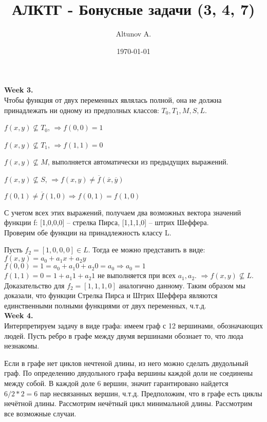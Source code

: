 \documentclass[a4paper,12pt]{article}
\author{Altunov A.}
\title{АЛКТГ - Бонусные задачи (3, 4, 7)}
\date{\today}
\begin{document}
\maketitle
\newpage
\textbf{Week 3.}
\\

Чтобы функция от двух переменных являлась полной, она не должна принадлежать ни одному из предполных классов: $ T_0, T_1, M, S, L $.

$ f(x,y) \nsubseteq T_0$, $ \Rightarrow f(0,0) = 1$

$ f(x,y) \nsubseteq T_1$, $ \Rightarrow f(1,1) = 0$

$ f(x,y) \nsubseteq M $, выполняется автоматически из предыдущих выражений.

$ f(x,y) \nsubseteq S $, $ \Rightarrow f(x,y) \neq \overline{f}(\overline{x},\overline{y}) $

$ f(0,1) \neq \overline{f}(1,0) \Rightarrow  f(0,1) = f(1,0) $

С учетом всех этих выражений, получаем два возможных вектора значений функции f: [1,0,0,0] -- стрелка Пирса, [1,1,1,0] -- штрих Шеффера.
\\
Проверим обе функции на принадлежность классу L.

Пусть $f_2 = [1,0,0,0] \in L$. Тогда ее можно представить в виде: $ f(x,y) = a_0 + a_1 x + a_2 y $
\\
$f(0,0) = 1 = a_0 + a_1 0 + a_2 0 = a_0 \Rightarrow a_0 = 1 $
\\
$ f(1,1) = 0 = 1 + a_1 1 + a_2 1 $ не выполняется при всех $a_1, a_2$.
$ \Rightarrow f(x,y) \nsubseteq L $.
\\
Доказательство для $f_2 = [1,1,1,0]$ аналогично данному.
Таким образом мы доказали, что функции Стрелка Пирса и Штрих Шеффера являются единственными полными функциями от двух переменных, ч.т.д.
\\

\textbf{Week 4.} 
\\

 Интерпретируем задачу в виде графа: имеем граф с 12 вершинами, обозначающих людей. Пусть ребро в графе между двумя вершинами обознает то, что люда незнакомы.

Если в графе нет циклов нечтеной длины, из него можно сделать двудольный граф. По определению двудольного графа вершины каждой доли не соединены между собой. В каждой доле 6 вершин, значит гарантировано найдется $ 6/2*2 = 6 $ пар несвязанных вершин, ч.т.д.
  Предположим, что в графе есть циклы нечётной длины. Рассмотрим нечётный цикл минимальной длины. Рассмотрим все возможные случаи.
\end{document}
